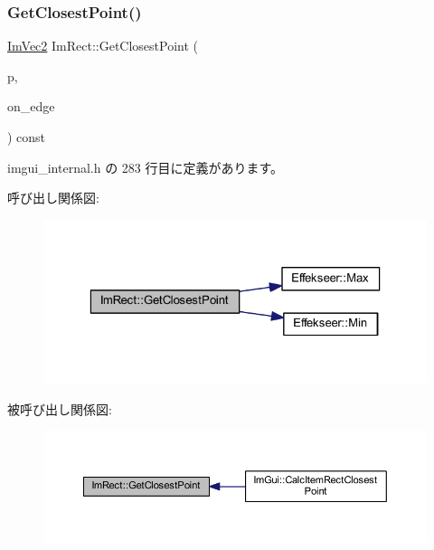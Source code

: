 \subsubsection{\texorpdfstring{Get\+Closest\+Point()}{GetClosestPoint()}}
{\footnotesize\ttfamily \mbox{\hyperlink{struct_im_vec2}{Im\+Vec2}} Im\+Rect\+::\+Get\+Closest\+Point (\begin{DoxyParamCaption}\item[{\mbox{\hyperlink{struct_im_vec2}{Im\+Vec2}}}]{p,  }\item[{bool}]{on\+\_\+edge }\end{DoxyParamCaption}) const\hspace{0.3cm}{\ttfamily [inline]}}



 imgui\+\_\+internal.\+h の 283 行目に定義があります。

呼び出し関係図\+:\nopagebreak
\begin{figure}[H]
\begin{center}
\leavevmode
\includegraphics[width=323pt]{struct_im_rect_a223c67d4c93e5c87a33a68ebb527bbb8_cgraph}
\end{center}
\end{figure}
被呼び出し関係図\+:\nopagebreak
\begin{figure}[H]
\begin{center}
\leavevmode
\includegraphics[width=350pt]{struct_im_rect_a223c67d4c93e5c87a33a68ebb527bbb8_icgraph}
\end{center}
\end{figure}
\mbox{\label{struct_im_rect_a748d8ae9cb26508951ec6e2f2df0625b}} 
